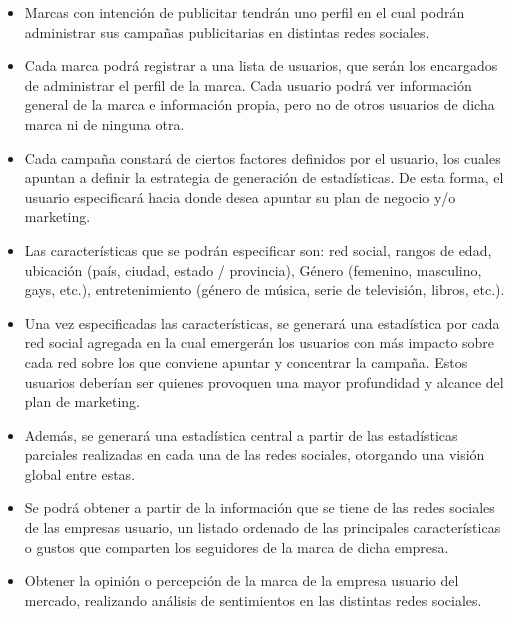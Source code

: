 \documentclass[oneside]{book}
\begin{document}
\begin{itemize}

\item Marcas con intenci\'{o}n de publicitar tendr\'{a}n uno perfil en el cual podr\'{a}n administrar sus campañas publicitarias en distintas redes sociales.

\item Cada marca podr\'{a} registrar a una lista de usuarios, que ser\'{a}n los encargados de administrar el perfil de la marca. Cada usuario podr\'{a} ver informaci\'{o}n general de la marca e informaci\'{o}n propia, pero no de otros usuarios de dicha marca ni de ninguna otra. 

\item Cada campa\~{n}a constar\'{a} de ciertos factores definidos por el usuario, los cuales apuntan a definir la estrategia de generaci\'{o}n de estad\'{i}sticas. De esta forma, el usuario especificar\'{a} hacia donde desea apuntar su plan de negocio y/o marketing.

\item Las caracter\'{i}sticas que se podrán especificar son: red social, rangos de edad, ubicación (pa\'{i}s, ciudad, estado / provincia), Género (femenino, masculino, gays, etc.), entretenimiento (g\'{e}nero de música, serie de televisi\'{o}n, libros, etc.).

\item Una vez especificadas las caracter\'{i}sticas, se generar\'{a} una estad\'{i}stica por cada red social agregada en la cual emerger\'{a}n los usuarios con m\'{a}s impacto sobre cada red sobre los que conviene apuntar y concentrar la campa\~{n}a. Estos usuarios deber\'{i}an ser quienes provoquen una mayor profundidad y alcance del plan de marketing. 

\item Adem\'{a}s, se generará una estad\'{i}stica central a partir de las estad\'{i}sticas parciales realizadas en cada una de las redes sociales, otorgando una visi\'{o}n global entre estas.

\item Se podr\'{a} obtener a partir de la informaci\'{o}n que se tiene de las redes sociales de las empresas usuario, un listado ordenado de las principales caracter\'{i}sticas o gustos que comparten los seguidores de la marca de dicha empresa.

\item Obtener la opinión o percepción de la marca de la empresa usuario del mercado, realizando an\'{a}lisis de sentimientos en las distintas redes sociales.


\end{itemize}
\end{document}
